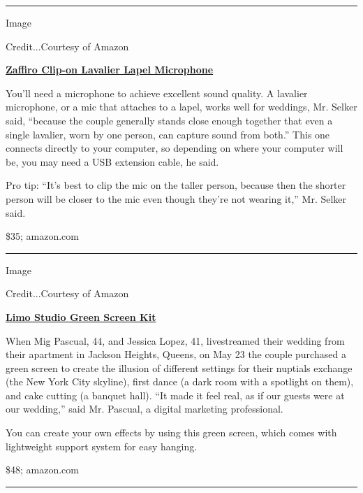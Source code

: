\begin{center}\rule{0.5\linewidth}{\linethickness}\end{center}

Image

Credit...Courtesy of Amazon

\textbf{\href{https://www.amazon.com/Microphone-ZAFFIRO-Omnidirectional-Recording-Podcasting/dp/B081R45D2X/ref=sr_1_6?dchild=1\&keywords=usb+lavalier\&qid=1592858828\&s=electronics\&sr=1-6}{Zaffiro
Clip-on Lavalier Lapel Microphone}}

You'll need a microphone to achieve excellent sound quality. A lavalier
microphone, or a mic that attaches to a lapel, works well for weddings,
Mr. Selker said, ``because the couple generally stands close enough
together that even a single lavalier, worn by one person, can capture
sound from both.'' This one connects directly to your computer, so
depending on where your computer will be, you may need a USB extension
cable, he said.

Pro tip: ``It's best to clip the mic on the taller person, because then
the shorter person will be closer to the mic even though they're not
wearing it,'' Mr. Selker said.

\$35; amazon.com

\begin{center}\rule{0.5\linewidth}{\linethickness}\end{center}

Image

Credit...Courtesy of Amazon

\textbf{\href{https://www.amazon.com/Photography-Backdrop-Support-Backdrops-AGG2983/dp/B08286P37D/ref=sr_1_6?dchild=1\&keywords=green+screen+kit\&qid=1593181526\&sr=8-6}{Limo
Studio Green Screen Kit}}

When Mig Pascual, 44, and Jessica Lopez, 41, livestreamed their wedding
from their apartment in Jackson Heights, Queens, on May 23 the couple
purchased a green screen to create the illusion of different settings
for their nuptials exchange (the New York City skyline), first dance (a
dark room with a spotlight on them), and cake cutting (a banquet hall).
``It made it feel real, as if our guests were at our wedding,'' said Mr.
Pascual, a digital marketing professional.

You can create your own effects by using this green screen, which comes
with lightweight support system for easy hanging.

\$48; amazon.com

\begin{center}\rule{0.5\linewidth}{\linethickness}\end{center}

